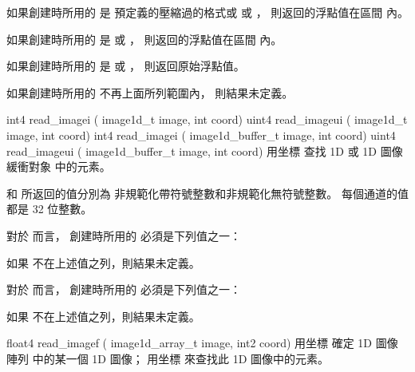 如果創建時所用的  是
預定義的壓縮過的格式或  或 ，
則返回的浮點值在區間 \math{[0.0 \cdots 1.0]} 內。

如果創建時所用的  是
  或 ，
則返回的浮點值在區間 \math{[-1.0 \cdots 1.0]} 內。

如果創建時所用的  是
  或 ，
則返回原始浮點值。

如果創建時所用的  不再上面所列範圍內，
則結果未定義。
\stopbuffer

int4 read_imagei (
	image1d_t image,
	int coord)
uint4 read_imageui (
	image1d_t image,
	int coord)
int4 read_imagei (
	image1d_buffer_t image,
	int coord)
uint4 read_imageui (
	image1d_buffer_t image,
	int coord)
\stopbuffer
{}
用坐標  查找 1D 或 1D 圖像緩衝對象  中的元素。

 和  所返回的值分別為
非規範化帶符號整數和非規範化無符號整數。
每個通道的值都是 32 位整數。

對於  而言，
創建時所用的  必須是下列值之一：
\startigBase[indentnext=no]
\item {}
\item {}
\item {}
\stopigBase
如果  不在上述值之列，則結果未定義。

對於  而言，
創建時所用的  必須是下列值之一：
\startigBase[indentnext=no]
\item {}
\item {}
\item {}
\stopigBase
如果  不在上述值之列，則結果未定義。
\stopbuffer

float4 read_imagef (
	image1d_array_t image,
	int2 coord)
\stopbuffer
{}
用坐標  確定 1D 圖像陣列  中的某一個 1D 圖像；
用坐標  來查找此 1D 圖像中的元素。

